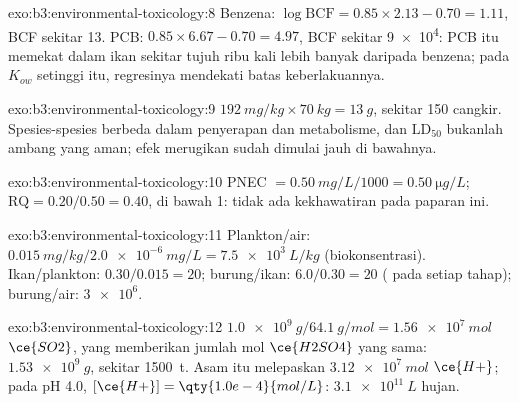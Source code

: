 \begin{solution}{exo:b3:environmental-toxicology:8}
Benzena: $\log\mathrm{BCF} = 0.85 \times 2.13 - 0.70 = 1.11$, BCF sekitar 13. PCB: $0.85 \times 6.67 - 0.70 = 4.97$, BCF sekitar
\num{9e4}: PCB itu memekat dalam ikan sekitar tujuh ribu kali lebih banyak daripada benzena; pada
$K_{ow}$ setinggi itu, regresinya mendekati batas keberlakuannya.
\end{solution}

\begin{solution}{exo:b3:environmental-toxicology:9}
$\qty{192}{mg/kg} \times \qty{70}{kg} = \qty{13}{g}$, sekitar 150 cangkir. Spesies-spesies berbeda dalam penyerapan dan metabolisme,
dan $\mathrm{LD_{50}}$ bukanlah ambang yang aman; efek merugikan sudah dimulai jauh di bawahnya.
\end{solution}

\begin{solution}{exo:b3:environmental-toxicology:10}
PNEC $= \qty{0.50}{mg/L}/1000 = \qty{0.50}{\micro g/L}$; $\mathrm{RQ} = 0.20/0.50 = 0.40$, di bawah 1: tidak ada kekhawatiran pada paparan ini.
\end{solution}

\begin{solution}{exo:b3:environmental-toxicology:11}
Plankton/air: $\qty{0.015}{mg/kg}/\qty{2.0e-6}{mg/L} = \qty{7.5e3}{L/kg}$ (biokonsentrasi). Ikan/plankton: $0.30/0.015 = 20$;
burung/ikan: $6.0/0.30 = 20$ ( pada setiap tahap); burung/air: $\num{3e6}$.
\end{solution}

\begin{solution}{exo:b3:environmental-toxicology:12}
$\qty{1.0e9}{g}/\qty{64.1}{g/mol} = \qty{1.56e7}{mol}$ $\ce{SO2}$, yang memberikan jumlah mol $\ce{H2SO4}$ yang sama: $\qty{1.53e9}{g}$, sekitar \qty{1500}{t}. Asam itu
melepaskan $\qty{3.12e7}{mol}$ $\ce{H+}$; pada pH 4.0, $[\ce{H+}] = \qty{1.0e-4}{mol/L}$: $\qty{3.1e11}{L}$ hujan.
\end{solution}

